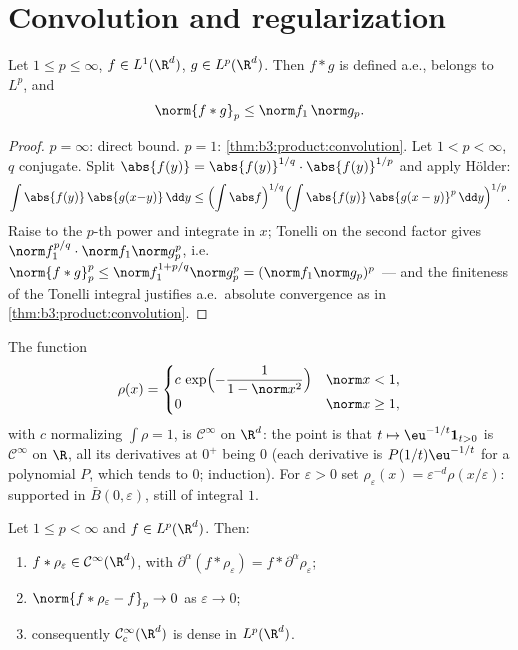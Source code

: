 \section{Convolution and regularization}

\begin{theorem}\label{thm:b3:lp:young}
Let $1 \leq p \leq \infty$, $f \in L^1(\R^d)$, $g \in
L^p(\R^d)$. Then $f * g$ is defined a.e., belongs to $L^p$,
and
\[
\norm{f * g}_p \leq \norm f_1\,\norm g_p .
\]
\end{theorem}

\begin{proof}
$p = \infty$: direct bound. $p = 1$:
\cref{thm:b3:product:convolution}. Let $1 < p < \infty$, $q$
conjugate. Split $\abs{f(y)} = \abs{f(y)}^{1/q}\cdot
\abs{f(y)}^{1/p}$ and apply H\"older:
\[
\int\abs{f(y)}\,\abs{g(x{-}y)}\,\dd y
\leq \Bigl(\int\abs f\Bigr)^{1/q}
\Bigl(\int\abs{f(y)}\,\abs{g(x - y)}^p\,\dd y\Bigr)^{1/p} .
\]
Raise to the $p$-th power and integrate in $x$; Tonelli on the
second factor gives $\norm f_1^{p/q}\cdot\norm f_1\norm g_p^p$,
i.e.\ $\norm{f*g}_p^p \leq \norm f_1^{1 + p/q}\norm g_p^p =
(\norm f_1\norm g_p)^p$ --- and the finiteness of the Tonelli
integral justifies a.e.\ absolute convergence as in
\cref{thm:b3:product:convolution}.
\end{proof}

\begin{definition}[Mollifiers]\label{def:b3:lp:mollifier}
The function
\[
\rho(x) = \begin{cases}
c\,\exp\Bigl(-\dfrac{1}{1 - \norm x^2}\Bigr) & \norm x < 1,\\
0 & \norm x \geq 1,
\end{cases}
\]
with $c$ normalizing $\int\rho = 1$, is $\mathcal C^\infty$ on
$\R^d$: the point is that $t \mapsto \eu^{-1/t}\mathbf
1_{t>0}$ is $\mathcal C^\infty$ on $\R$, all its derivatives at
$0^+$ being $0$ (each derivative is $P(1/t)\eu^{-1/t}$ for a
polynomial $P$, which tends to $0$; induction). For
$\varepsilon > 0$ set $\rho_\varepsilon(x) =
\varepsilon^{-d}\rho(x/\varepsilon)$: supported in $\bar B(0,
\varepsilon)$, still of integral $1$.
\end{definition}

\begin{theorem}[Regularization]\label{thm:b3:lp:regularization}
Let $1 \leq p < \infty$ and $f \in L^p(\R^d)$. Then:
\begin{enumerate}
  \item $f * \rho_\varepsilon \in \mathcal C^\infty(\R^d)$,
        with $\partial^\alpha(f * \rho_\varepsilon) = f *
        \partial^\alpha\rho_\varepsilon$;
  \item $\norm{f * \rho_\varepsilon - f}_p \to 0$ as
        $\varepsilon \to 0$;
  \item consequently $\mathcal C^\infty_c(\R^d)$ is dense in
        $L^p(\R^d)$.
\end{enumerate}
\end{theorem}

